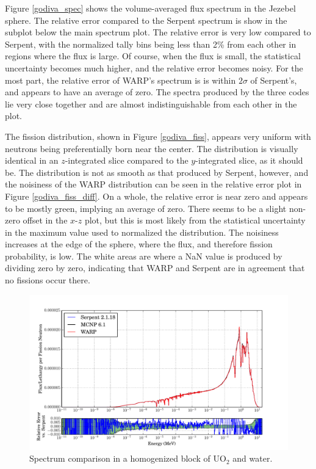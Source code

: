 Figure \ref{godiva_spec} shows the volume-averaged flux spectrum in the Jezebel sphere.  The relative error compared to the Serpent spectrum is show in the subplot below the main spectrum plot.  The relative error is very low compared to Serpent, with the normalized tally bins being less than 2\% from each other in regions where the flux is large.  Of course, when the flux is small, the statistical uncertainty becomes much higher, and the relative error becomes noisy.   For the most part, the relative error of WARP's spectrum is is within $2\sigma$ of Serpent's, and appears to have an average of zero.  The spectra produced by the three codes lie very close together and are almost indistinguishable from each other in the plot.  

The fission distribution, shown in Figure \ref{godiva_fiss}, appears very uniform with neutrons being preferentially born near the center.  The distribution is visually identical in an $z$-integrated slice compared to the $y$-integrated slice, as it should be.  The distribution is not as smooth as that produced by Serpent, however, and the noisiness of the WARP distribution can be seen in the relative error plot in Figure \ref{godiva_fiss_diff}.  On a whole, the relative error is near zero and appears to be mostly green, implying an average of zero.  There seems to be a slight non-zero offset in the $x$-$z$ plot, but this is most likely from the statistical uncertainty in the maximum value used to normalized the distribution.  The noisiness increases at the edge of the sphere, where the flux, and therefore fission probability, is low.  The white areas are where a NaN value is produced by dividing zero by zero, indicating that WARP and Serpent are in agreement that no fissions occur there.


\begin{figure}[h!] 
\centering
\includegraphics[width=\textwidth,trim= 1cm 0cm 1cm 0cm]{graphics/finalresults/homfuel_spec-6.pdf}
\caption{Spectrum comparison in a homogenized block of UO$_2$ and water. \label{homfuel_spec} }
\end{figure}

